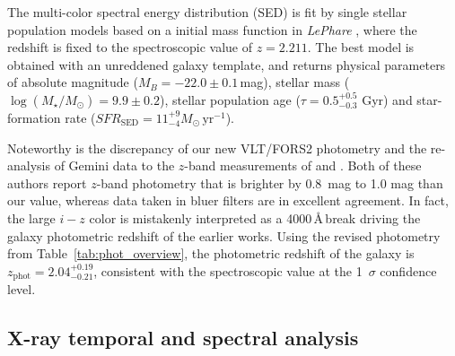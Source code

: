 \documentclass{aa}    %
\begin{document}
The multi-color spectral energy distribution (SED) is fit by
\citet{Bruzual2003} single stellar population models based on a
\citet{Chabrier2003} initial mass function in \emph{LePhare} \citep{Ilbert2006},
where the redshift is fixed to the spectroscopic value of $z=2.211$. The best
model is obtained with an unreddened galaxy template, and returns physical
parameters of absolute magnitude ($M_B=-22.0\pm0.1$\,mag), stellar mass
($\log(M_{\star}/M_\odot) = 9.9\pm0.2$), stellar population age ($\tau =
0.5_{-0.3}^{+0.5}$ Gyr) and star-formation rate
($SFR_{\mathrm{SED}}=11_{-4}^{+9} M_\odot\,\mathrm{yr}^{-1}$). %

Noteworthy is the discrepancy of our new VLT/FORS2 photometry and the
re-analysis of Gemini data to the $z$-band measurements of \citet{Margutti2012} and
\citet{Sakamoto2013}. Both of these authors report $z$-band photometry that is brighter 
by 0.8~mag to 1.0 mag than our value, whereas data taken in bluer filters are in excellent agreement. In fact, the large $i-z$ color is mistakenly interpreted as a 4000\,\AA\,break
driving the galaxy photometric redshift of the earlier works. Using
the revised photometry from Table~\ref{tab:phot_overview}, the photometric redshift of the
galaxy is $z_{\mathrm{phot}}=2.04_{-0.21}^{+0.19}$, consistent with the
spectroscopic value at the 1~$\sigma$ confidence level.






\subsection{X-ray temporal and spectral analysis}
\end{document}
